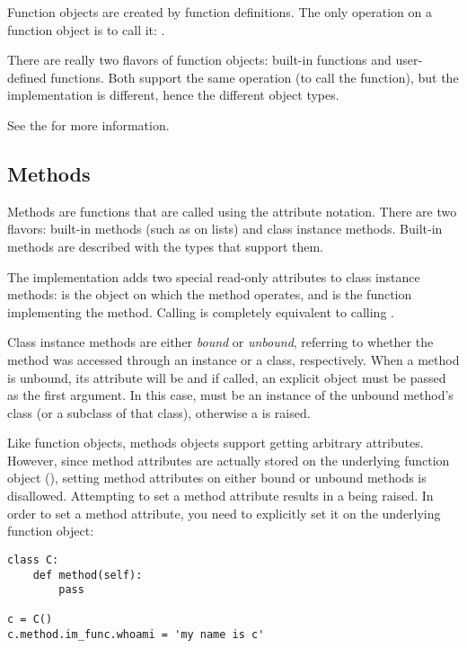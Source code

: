 Function objects are created by function definitions.  The only
operation on a function object is to call it:
.

There are really two flavors of function objects: built-in functions
and user-defined functions.  Both support the same operation (to call
the function), but the implementation is different, hence the
different object types.

See the  for more
information.

\subsection{Methods \label{typesmethods}}

Methods are functions that are called using the attribute notation.
There are two flavors: built-in methods (such as  on
lists) and class instance methods.  Built-in methods are described
with the types that support them.

The implementation adds two special read-only attributes to class
instance methods:  is the object on which the
method operates, and  is the function
implementing the method.  Calling  is completely equivalent to
calling .

Class instance methods are either \emph{bound} or \emph{unbound},
referring to whether the method was accessed through an instance or a
class, respectively.  When a method is unbound, its 
attribute will be  and if called, an explicit 
object must be passed as the first argument.  In this case,
 must be an instance of the unbound method's class (or a
subclass of that class), otherwise a  is raised.

Like function objects, methods objects support getting
arbitrary attributes.  However, since method attributes are actually
stored on the underlying function object (),
setting method attributes on either bound or unbound methods is
disallowed.  Attempting to set a method attribute results in a
 being raised.  In order to set a method attribute,
you need to explicitly set it on the underlying function object:

\begin{verbatim}
class C:
    def method(self):
        pass

c = C()
c.method.im_func.whoami = 'my name is c'
\end{verbatim}

